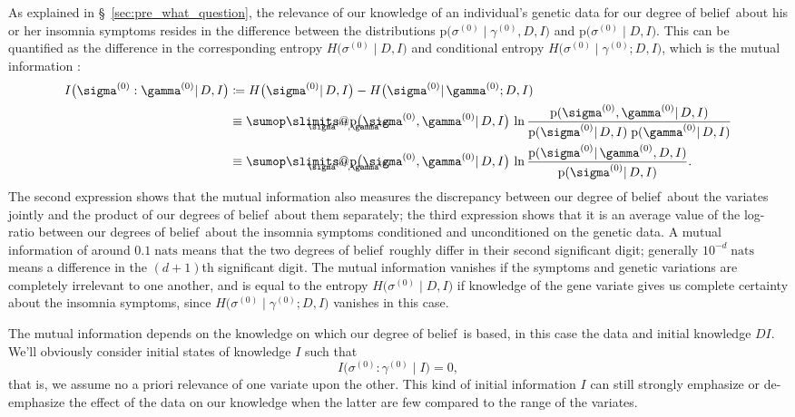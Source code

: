 \documentclass[\ifafour a4paper,12pt,\else a5paper,10pt,\fi%
onecolumn,oneside,article,%
british%
]{memoir}
\makeatletter
\theoremstyle{remark}
\theoremstyle{innote}
\def\sum{\DOTSI\sumop\slimits@}
\newcommand*{\citep}{\parencites}
\newcommand*{\defd}{\coloneqq}
\newcommand*{\pf}{\mathrm{p}}%
\renewcommand*{\|}{\mathpunct{|}}
\newcommand*{\sect}{\S}%
\newcommand*{\chap}{ch.}%
\newcommand*{\dob}{degree of belief}
\newcommand*{\dobs}{degrees of belief}
\newcommand*{\yD}{D}
\newcommand*{\yI}{I}
\newcommand*{\sH}{H}
\newcommand*{\mI}{I}
\newcommand*{\ys}{\sigma}
\newcommand*{\yg}{\gamma}
\newcommand*{\ysi}[1]{\ys^{(#1)}}
\newcommand*{\ygi}[1]{\yg^{(#1)}}
\newcommand*{\yso}{\ysi{0}}
\newcommand*{\ygo}{\ygi{0}}
\makeatother
\begin{document}
As explained in \sect~\ref{sec:pre_what_question}, the relevance of our
knowledge of an individual's genetic data for our \dob\ about his or her
insomnia symptoms resides in the difference between the distributions
$\pf\bigl(\yso\| \ygo, \yD, \yI\bigr)$ and
$\pf\bigl(\yso \| \yD, \yI\bigr)$. This can be quantified as the difference
in the corresponding entropy $\sH\bigl(\yso \| \yD,\yI\bigr)$
and conditional entropy
$\sH\bigl(\yso \| \ygo; \yD,\yI)$, which is the
mutual information \citep[in these called
\enquote{rate of
  transmission}]{shannon1948,kelly1956}[\sect~14.7]{pressetal1988_r2007}[\chap~2]{coveretal1991_r2006}:
\begin{equation}
  \label{eq:pre_mutual_info_new_ind}
  \begin{split}
  \mI\bigl( \ysi{0} : \ygi{0} \| \yD,\yI \bigr) &\defd
  \sH\bigl(\yso \| \yD,\yI\bigr) -
  \sH\bigl(\yso \| \ygo; \yD,\yI)
  \\
  &\equiv
  \sum_{\mathclap{\ysi{0},\ygi{0}}} \pf\bigl(\ysi{0}, \ygi{0} \| \yD, \yI\bigr)
 \, \ln\frac{\pf(\ysi{0}, \ygi{0} \| \yD, \yI)}{
    \pf(\ysi{0} \| \yD, \yI)\;
    \pf(\ygi{0} \| \yD, \yI)}
  \\
  &\equiv
  \sum_{\mathclap{\ysi{0},\ygi{0}}} \pf\bigl(\ysi{0}, \ygi{0} \| \yD, \yI\bigr)
 \, \ln\frac{\pf(\ysi{0}\| \ygi{0}, \yD, \yI)}{
    \pf(\ysi{0} \| \yD, \yI)}.
\end{split}
\end{equation}
The second expression shows that the mutual information also measures the
discrepancy between our \dob\ about the variates jointly and the product of
our \dobs\ about them separately; the third expression shows that it is an
average value of the log-ratio between our \dobs\ about the insomnia
symptoms conditioned and unconditioned on the genetic data. A mutual
information of around $0.1\;\textrm{nats}$ means that the two \dobs\
roughly differ in their second significant digit; generally
$10^{-d}\;\textrm{nats}$ means a difference in the $(d+1)$th significant
digit. The mutual information vanishes if the symptoms and genetic
variations are completely irrelevant to one another, and is equal to the
entropy $\sH\bigl(\yso \|
\yD,\yI\bigr)$ %
if knowledge of the gene variate gives us complete certainty about the
insomnia symptoms, since $\sH\bigl(\yso \| \ygo; \yD,\yI)$ vanishes in this
case.


The mutual information depends on the knowledge on which our \dob\ is
based, in this case the data and initial knowledge $\yD\yI$. We'll
obviously consider initial states of knowledge $\yI$ such that
\begin{equation}
\mI\bigl( \ysi{0} : \ygi{0} \| \yI \bigr) =0,
\end{equation}
that is, we assume no a priori relevance of one variate upon the other.
This kind of initial information $\yI$ can still strongly emphasize or
de-emphasize the effect of the data on our knowledge when the latter are
few compared to the range of the variates.
\end{document}

